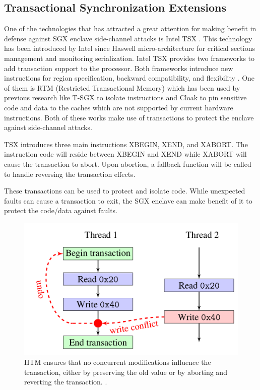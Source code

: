 \subsection{Transactional Synchronization Extensions}
One of the technologies that has attracted a great attention for making benefit in defense against SGX enclave side-channel attacks is Intel TSX \cite{tsx}. This technology has been introduced by Intel since Haswell micro-architecture \cite{haswell} for critical sections management and monitoring serialization. Intel TSX provides two frameworks to add transaction support to the processor. Both frameworks introduce new instructions for region specification, backward compatibility, and flexibility \cite{tsx}. One of them is RTM (Restricted Transactional Memory) \cite{rtm} which has been used by previous research like T-SGX \cite{tsgx} to isolate instructions and Cloak \cite{cloak} to pin sensitive code and data to the caches which are not supported by current hardware instructions. Both of these works make use of transactions to protect the enclave against side-channel attacks.

TSX introduces three main instructions XBEGIN, XEND, and XABORT. The instruction code will reside between XBEGIN and XEND while XABORT will cause the transaction to abort. Upon abortion, a fallback function will be called to handle reversing the transaction effects.

These transactions can be used to protect and isolate code. While unexpected faults can cause a transaction to exit, the SGX enclave can make benefit of it to protect the code/data against faults.
\begin{figure}
	\includegraphics[scale=0.2]{images/rtm}
	\caption{HTM ensures that no concurrent modifications influence the transaction, either by preserving the old value or by aborting and reverting the transaction. \cite{cloak}.}
	\label{fig:rtm}
\end{figure}


